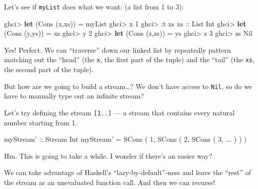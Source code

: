 \documentclass[]{article}
\newenvironment{Shaded}{}{}
\newcommand{\DataTypeTok}[1]{\textcolor[rgb]{0.56,0.13,0.00}{#1}}
\newcommand{\DecValTok}[1]{\textcolor[rgb]{0.25,0.63,0.44}{#1}}
\newcommand{\FunctionTok}[1]{\textcolor[rgb]{0.02,0.16,0.49}{#1}}
\newcommand{\KeywordTok}[1]{\textcolor[rgb]{0.00,0.44,0.13}{\textbf{#1}}}
\newcommand{\NormalTok}[1]{#1}
\newcommand{\OtherTok}[1]{\textcolor[rgb]{0.00,0.44,0.13}{#1}}
\begin{document}
Let's see if \texttt{myList} does what we want: (a list from 1 to 3):

\begin{Shaded}
\begin{Highlighting}[]
\NormalTok{ghci}\FunctionTok{>} \KeywordTok{let}\NormalTok{ (}\DataTypeTok{Cons}\NormalTok{ (x,xs)) }\FunctionTok{=}\NormalTok{ myList}
\NormalTok{ghci}\FunctionTok{>}\NormalTok{ x}
\DecValTok{1}
\NormalTok{ghci}\FunctionTok{>} \FunctionTok{:}\NormalTok{t xs}
\OtherTok{xs ::} \DataTypeTok{List} \DataTypeTok{Int}
\NormalTok{ghci}\FunctionTok{>} \KeywordTok{let}\NormalTok{ (}\DataTypeTok{Cons}\NormalTok{ (y,ys)) }\FunctionTok{=}\NormalTok{ xs}
\NormalTok{ghci}\FunctionTok{>}\NormalTok{ y}
\DecValTok{2}
\NormalTok{ghci}\FunctionTok{>} \KeywordTok{let}\NormalTok{ (}\DataTypeTok{Cons}\NormalTok{ (z,zs)) }\FunctionTok{=}\NormalTok{ ys}
\NormalTok{ghci}\FunctionTok{>}\NormalTok{ z}
\DecValTok{3}
\NormalTok{ghci}\FunctionTok{>}\NormalTok{ zs}
\DataTypeTok{Nil}
\end{Highlighting}
\end{Shaded}

Yes! Perfect. We can ``traverse'' down our linked list by repeatedly pattern
matching out the ``head'' (the \texttt{x}, the first part of the tuple) and the
``tail'' (the \texttt{xs}, the second part of the tuple).

But how are we going to build a stream\ldots{}? We don't have access to
\texttt{Nil}, so do we have to manually type out an infinite stream?

Let's try defining the stream \texttt{{[}1..{]}} --- a stream that contains
every natural number starting from 1.

\begin{Shaded}
\begin{Highlighting}[]
\OtherTok{myStream' ::} \DataTypeTok{Stream} \DataTypeTok{Int}
\NormalTok{myStream' }\FunctionTok{=} \DataTypeTok{SCons}\NormalTok{ ( }\DecValTok{1}\NormalTok{, }\DataTypeTok{SCons}\NormalTok{ ( }\DecValTok{2}\NormalTok{, }\DataTypeTok{SCons}\NormalTok{ ( }\DecValTok{3}\NormalTok{, }\FunctionTok{...}\NormalTok{ ) ) )}
\end{Highlighting}
\end{Shaded}

Hm. This is going to take a while. I wonder if there's an easier way?

We can take advantage of Haskell's ``lazy-by-default''-ness and leave the
``rest'' of the stream as an unevaluated function call. And then we can recurse!
\end{document}
